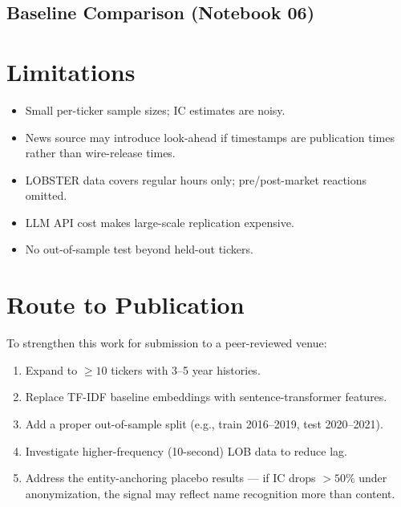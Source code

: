 \documentclass[12pt, letterpaper]{article}
\begin{document}
\subsection{Baseline Comparison (Notebook 06)}


\section{Limitations}
\label{sec:limits}

\begin{itemize}
  \item Small per-ticker sample sizes; IC estimates are noisy.
  \item News source may introduce look-ahead if timestamps are publication
        times rather than wire-release times.
  \item LOBSTER data covers regular hours only; pre/post-market reactions omitted.
  \item LLM API cost makes large-scale replication expensive.
  \item No out-of-sample test beyond held-out tickers.
\end{itemize}


\section{Route to Publication}
\label{sec:publication}

To strengthen this work for submission to a peer-reviewed venue:
\begin{enumerate}
  \item Expand to $\geq 10$ tickers with 3--5 year histories.
  \item Replace TF-IDF baseline embeddings with sentence-transformer features.
  \item Add a proper out-of-sample split (e.g., train 2016--2019, test 2020--2021).
  \item Investigate higher-frequency (10-second) LOB data to reduce lag.
  \item Address the entity-anchoring placebo results — if IC drops $>50\%$
        under anonymization, the signal may reflect name recognition more
        than content.
\end{enumerate}


\appendix
\end{document}
